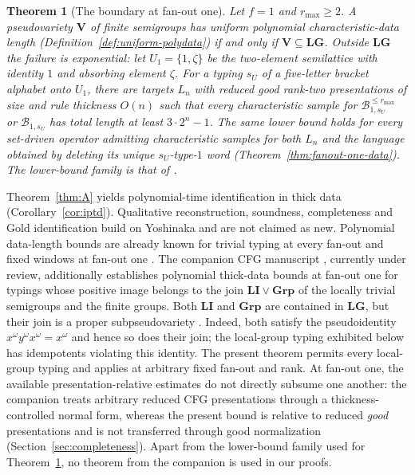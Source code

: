 \documentclass[11pt]{article}
\numberwithin{equation}{section}
\theoremstyle{plain}
\theoremstyle{definition}
\theoremstyle{remark}
\theoremstyle{plain}
\newtheorem{mainthm}{Theorem}
\begin{document}
\begin{mainthm}[The boundary at fan-out one]
\label{thm:C}
Let $f=1$ and $r_{\max}\ge2$.  A pseudovariety $\mathbf V$ of finite
semigroups has uniform polynomial characteristic-data length
\textup(Definition~\ref{def:uniform-polydata}\textup) if and only if
$\mathbf V\subseteq\mathbf{LG}$.  Outside $\mathbf{LG}$ the failure is exponential: let
$U_1=\{1,\zeta\}$ be the two-element semilattice with identity $1$
and absorbing element $\zeta$.  For a typing $s_U$ of a five-letter
bracket alphabet onto $U_1$, there are targets $L_n$ with reduced good
rank-two presentations of size and rule thickness $O(n)$ such that
every characteristic sample for $\mathcal B^{\le r_{\max}}_{1,s_U}$
or $\mathcal B_{1,s_U}$ has total length at least $3\cdot2^n-1$.
The same lower bound holds for every set-driven operator admitting
characteristic samples for both $L_n$ and the language obtained by
deleting its unique $s_U$-type-$1$ word
\textup(Theorem~\ref{thm:fanout-one-data}\textup).
The lower-bound family is that of \cite[Proposition~6.4]{kuriyamaCFG}.
\end{mainthm}

Theorem~\ref{thm:A} yields polynomial-time identification in thick
data (Corollary~\ref{cor:iptd}).  Qualitative reconstruction,
soundness, completeness and Gold identification build on Yoshinaka
\cite{Yoshinaka2011,Yoshinaka2015General} and are not claimed as new.
Polynomial data-length bounds are already known for trivial typing at
every fan-out \cite{Yoshinaka2011} and fixed windows at fan-out one
\cite{Yoshinaka2008}.  The companion CFG manuscript
\cite{kuriyamaCFG}, currently under review, additionally establishes
polynomial thick-data bounds at fan-out one for typings whose positive
image belongs to the join $\mathbf{LI}\vee\mathbf{Grp}$ of the locally
trivial semigroups and the finite groups.  Both
$\mathbf{LI}$ and $\mathbf{Grp}$ are contained in $\mathbf{LG}$,
but their join is a proper subpseudovariety
\cite{CostaNogueiraTeixeira2021}.  Indeed, both satisfy the
pseudoidentity $x^\omega y^\omega x^\omega=x^\omega$ and hence so
does their join; the local-group typing exhibited below has
idempotents violating this identity.
The present theorem permits every local-group typing and applies
at arbitrary fixed fan-out and rank.
At fan-out one, the available presentation-relative estimates
do not directly subsume one another: the companion treats arbitrary
reduced CFG presentations through a thickness-controlled normal
form, whereas the present bound is relative to reduced \emph{good}
presentations and is not transferred through good normalization
(Section~\ref{sec:completeness}).  Apart from the lower-bound family
used for Theorem~\ref{thm:C}, no theorem from the companion is used in
our proofs.
\end{document}
